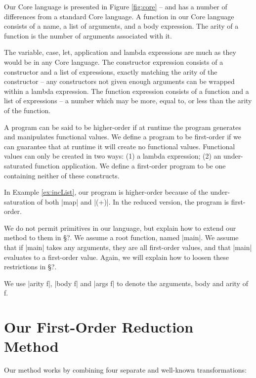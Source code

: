 \documentclass[preprint]{sigplanconf}
\begin{document}
Our Core language is presented in Figure \ref{fig:core} -- and has a number of differences from a standard Core language. A function in our Core language consists of a name, a list of arguments, and a body expression. The arity of a function is the number of arguments associated with it.

The variable, case, let, application and lambda expressions are much as they would be in any Core language. The constructor expression consists of a constructor and a list of expressions, exactly matching the arity of the constructor -- any constructors not given enough arguments can be wrapped within a lambda expression. The function expression consists of a function and a list of expressions -- a number which may be more, equal to, or less than the arity of the function.

A program can be said to be higher-order if at runtime the program generates and manipulates functional values. We define a program to be first-order if we can guarantee that at runtime it will create no functional values. Functional values can only be created in two ways: (1) a lambda expression; (2) an under-saturated function application. We define a first-order program to be one containing neither of these constructs.

In Example \ref{ex:incList}, our program is higher-order because of the under-saturation of both |map| and |(+)|. In the reduced version, the program is first-order.

We do not permit primitives in our language, but explain how to extend our method to them in \S?. We assume a root function, named |main|. We assume that if |main| takes any arguments, they are all first-order values, and that |main| evaluates to a first-order value. Again, we will explain how to loosen these restrictions in \S?.

We use |arity f|, |body f| and |args f| to denote the arguments, body and arity of f.


\section{Our First-Order Reduction Method}

Our method works by combining four separate and well-known transformations:
\end{document}
